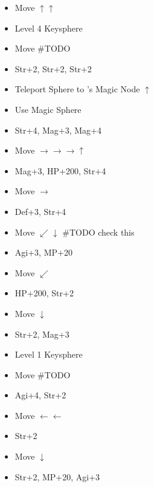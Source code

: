 \begin{spheregrid}
\begin{itemize}
		\begin{itemize}
			\item Move $\uparrow\uparrow$
			\item Level 4 Keysphere
			\item Move #TODO
			\item Str+2, Str+2, Str+2
			\item Teleport Sphere to \auron's Magic Node $\uparrow$
			\item Use Magic Sphere
			\item Str+4, Mag+3, Mag+4
			\item Move $\rightarrow\rightarrow\rightarrow\uparrow$
			\item Mag+3, HP+200, Str+4
			\item Move $\rightarrow$
			\item Def+3, Str+4
			\item Move $\swarrow\downarrow$ #TODO check this
			\item Agi+3, MP+20
			\item Move $\swarrow$
			\item HP+200, Str+2
			\item Move $\downarrow$
			\item Str+2, Mag+3
			\item Level 1 Keysphere
			\item Move #TODO
			\item Agi+4, Str+2
			\item Move $\leftarrow\leftarrow$
			\item Str+2
			\item Move $\downarrow$
			\item Str+2, MP+20, Agi+3
		\end{itemize}
	\end{itemize}
\end{spheregrid}
